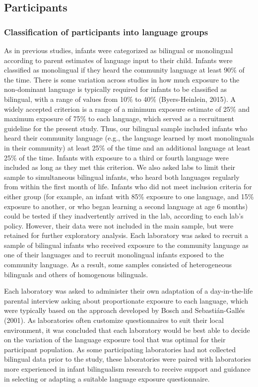 \documentclass[,man,floatsintext]{apa6}
\begin{document}
\hypertarget{participants}{%
\subsection{Participants}\label{participants}}

\hypertarget{classification-of-participants-into-language-groups}{%
\subsubsection{Classification of participants into language groups}\label{classification-of-participants-into-language-groups}}

As in previous studies, infants were categorized as bilingual or monolingual according to parent estimates of language input to their child. Infants were classified as monolingual if they heard the community language at least 90\% of the time. There is some variation across studies in how much exposure to the non-dominant language is typically required for infants to be classified as bilingual, with a range of values from 10\% to 40\% (Byers-Heinlein, 2015). A widely accepted criterion is a range of a minimum exposure estimate of 25\% and maximum exposure of 75\% to each language, which served as a recruitment guideline for the present study. Thus, our bilingual sample included infants who heard their community language (e.g., the language learned by most monolinguals in their community) at least 25\% of the time and an additional language at least 25\% of the time. Infants with exposure to a third or fourth language were included as long as they met this criterion. We also asked labs to limit their sample to simultaneous bilingual infants, who heard both languages regularly from within the first month of life. Infants who did not meet inclusion criteria for either group (for example, an infant with 85\% exposure to one language, and 15\% exposure to another, or who began learning a second language at age 6 months) could be tested if they inadvertently arrived in the lab, according to each lab's policy. However, their data were not included in the main sample, but were retained for further exploratory analysis. Each laboratory was asked to recruit a sample of bilingual infants who received exposure to the community language as one of their languages and to recruit monolingual infants exposed to the community language. As a result, some samples consisted of heterogeneous bilinguals and others of homogenous bilinguals.

Each laboratory was asked to administer their own adaptation of a day-in-the-life parental interview asking about proportionate exposure to each language, which were typically based on the approach developed by Bosch and Sebastián-Gallés (2001). As laboratories often customize questionnaires to suit their local environment, it was concluded that each laboratory would be best able to decide on the variation of the language exposure tool that was optimal for their participant population. As some participating laboratories had not collected bilingual data prior to the study, these laboratories were paired with laboratories more experienced in infant bilingualism research to receive support and guidance in selecting or adapting a suitable language exposure questionnaire.
\end{document}
